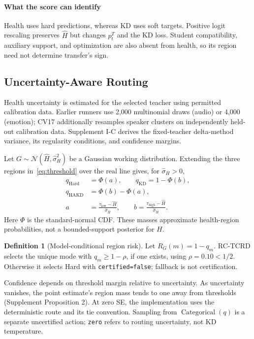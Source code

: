 \documentclass[journal]{IEEEtran}
\theoremstyle{definition}
\newtheorem{definition}{Definition}
\theoremstyle{plain}
\begin{document}
\paragraph*{What the score can identify}
Health uses hard predictions, whereas KD uses soft targets. Positive logit rescaling preserves $\widehat H$ but changes $p_t^T$ and the KD loss. Student compatibility, auxiliary support, and optimization are also absent from health, so its region need not determine transfer's sign.

\subsection{Uncertainty-Aware Routing}
\label{sec:rctcrd_likelihood}
Health uncertainty is estimated for the selected teacher using permitted calibration data. Earlier runners use 2,000 multinomial draws (audio) or 4,000 (emotion); CV17 additionally resamples speaker clusters on independently held-out calibration data. Supplement I-C derives the fixed-teacher delta-method variance, its regularity conditions, and confidence margins.

Let $G\sim\mathcal N(\widehat H,\widehat\sigma_H^2)$ be a Gaussian working distribution. Extending the three regions in~\eqref{eq:threshold} over the real line gives, for $\widehat\sigma_H>0$,
\begin{equation}
\begin{aligned}
q_{\mathrm{Hard}}&=\Phi(a),\qquad q_{\mathrm{KD}}=1-\Phi(b),\\
q_{\mathrm{HAKD}}&=\Phi(b)-\Phi(a),\\
a&=\frac{\tau_{\mathrm{low}}-\widehat H}{\widehat\sigma_H},\qquad
b=\frac{\tau_{\mathrm{high}}-\widehat H}{\widehat\sigma_H}.
\end{aligned}
\label{eq:routing_masses}
\end{equation}
Here $\Phi$ is the standard-normal CDF. These masses approximate health-region probabilities, not a bounded-support posterior for $H$.

\begin{definition}[Model-conditional region risk]
\label{def:rctcrd-main}
Let $R_G(m)=1-q_m$. RC-TCRD selects the unique mode with $q_m\ge1-\rho$, if one exists, using $\rho=0.10<1/2$. Otherwise it selects Hard with \texttt{certified=false}; fallback is not certification.
\end{definition}
Confidence depends on threshold margin relative to uncertainty. As uncertainty vanishes, the point estimate's region mass tends to one away from thresholds (Supplement Proposition 2). At zero SE, the implementation uses the deterministic route and its tie convention. Sampling from $\operatorname{Categorical}(q)$ is a separate uncertified action; \texttt{zero} refers to routing uncertainty, not KD temperature.
\end{document}

